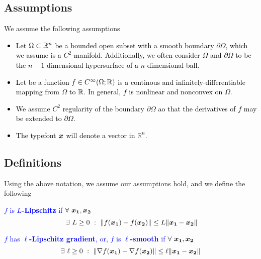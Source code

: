 \documentclass[11pt]{article}
\begin{document}
    \medskip

    \subsection{Assumptions}
    We assume the following assumptions\

    \textcolor{Black}{
        \begin{itemize}
            \item Let $\Omega \subset \mathbb{R}^n$ be a bounded open subset with a smooth boundary $\partial \Omega$,
            which we assume is a $C^2$-manifold. Additionally, we often consider $\Omega$ and $\partial \Omega$
            to be the $n-1$-dimensional hypersurface of a $n$-dimensional ball.
            \item Let be a function $f \in C^\infty(\Omega; \mathbb{R})$ is a continous
            and infinitely-differentiable mapping from $\Omega$ to $\mathbb{R}$.
            In general, $f$ is nonlinear and nonconvex on $\Omega$.
            \item We assume $C^2$ regularity of the boundary $\partial \Omega$
            ao that the derivatives of $f$ may be extended to $\partial \Omega$.
            \item The typefont $\bm{x}$ will denote a vector in $\mathbb{R}^n$.
        \end{itemize}
    }

    \subsection{Definitions}
    Using the above notation, we assume our assumptions hold, and we define the following\
    \begin{definition}
    \textcolor{blue}{
        $f$ is \textbf{$L$-Lipschitz} if $\forall ~ \bm{x_1},\bm{x_2}$
        $$
        \; \exists~ L \geq 0 ~:~  \| f(\bm{x_1}) - f(\bm{x_2})\| 
        \leq L\|\bm{x_1} - \bm{x_2}\|
        $$
    }
    \end{definition}

    \begin{definition} 
    \textcolor{blue}{
        $f$ has \textbf{$\ell$-Lipschitz gradient}, or, $f$ is \textbf{$\ell$-smooth} if
        $\forall ~ \bm{x_1},\bm{x_2}$
        $$
            \exists~ \ell \geq 0 ~:~ \|\nabla f(\bm{x_1}) - \nabla f(\bm{x_2})\| 
            \leq \ell\|\bm{x_1} - \bm{x_2}\|
        $$
    }
    \end{definition}
\end{document}
